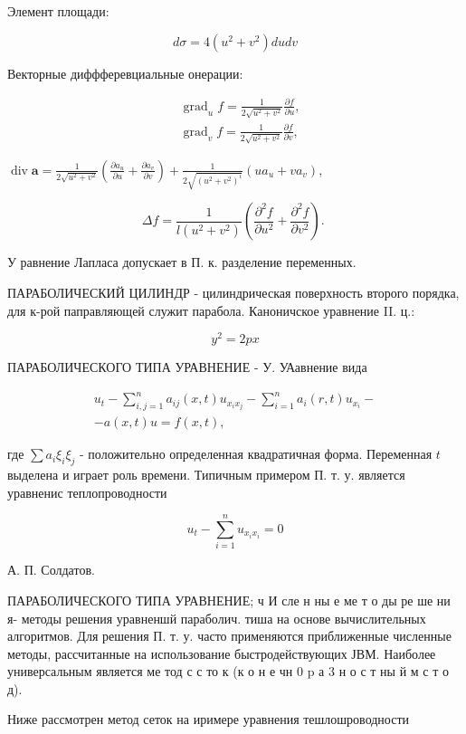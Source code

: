 \documentclass[10pt]{article}
\begin{document}
Элемент площади:

\[
d \sigma=4\left(u^{2}+v^{2}\right) d u d v
\]

Векторные диффферевциальные онерации:

\[
\begin{aligned}
& \operatorname{grad}_{u} f=\frac{1}{2 \sqrt{u^{2}+v^{2}}} \frac{\partial f}{\partial u}, \\
& \operatorname{grad}_{v} f=\frac{1}{2 \sqrt{u^{2}+v^{2}}} \frac{\partial f}{\partial v},
\end{aligned}
\]

$\operatorname{div} \boldsymbol{a}=\frac{1}{2 \sqrt{u^{2}+v^{2}}}\left(\frac{\partial a_{u}}{\partial u}+\frac{\partial a_{v}}{\partial v}\right)+\frac{1}{2 \sqrt{\left(u^{2}+v^{2}\right)^{i}}}\left(u a_{u}+v a_{v}\right)$,

\[
\Delta f=\frac{1}{l\left(u^{2}+v^{2}\right)}\left(\frac{\partial^{2} f}{\partial u^{2}}+\frac{\partial^{2} f}{\partial v^{2}}\right) \text {. }
\]

У равнение Лапласа допускает в П. к. разделение переменных.

ПАРАБОЛИЧЕСКИЙ ЦИЛИНДР - цилиндрическая поверхность второго порядка, для к-рой паправляющей служит парабола. Каноничское уравнение II. ц.:

\[
y^{2}=2 p x
\]

ПАРАБОЛИЧЕСКОГО ТИПА УРАВНЕНИЕ - У. УАавнение вида

\[
\begin{gathered}
u_{t}-\sum_{i, j=1}^{n} a_{i j}(x, t) u_{x_{i} x_{j}}-\sum_{i=1}^{n} a_{i}(r, t) u_{x_{i}}- \\
-a(x, t) u=f(x, t),
\end{gathered}
\]

где $\sum a_{i} \xi_{i} \xi_{j}$ - положительно определенная квадратичная форма. Переменная $t$ выделена и играет роль времени. Типичным примером П. т. у. является уравненис теплопроводности

\[
u_{t}-\sum_{i=1}^{n} u_{x_{i} x_{i}}=0
\]

А. П. Солдатов.

ПАРАБОЛИЧЕСКОГО ТИПА УРАВНЕНИЕ; ч И сле н ны е ме т о ды ре ше ни я- методы решения уравненшй параболич. тиша на основе вычислительных алгоритмов. Для решения П. т. у. часто применяются приближенные численные методы, рассчитанные на использование быстродействующих ЈВМ. Наиболее универсальным является ме тод с с то к (к о н е чн 0 p а 3 н о с т ны й м с т о д).

Ниже рассмотрен метод сеток на иримере уравнения тешлошроводности
\end{document}
